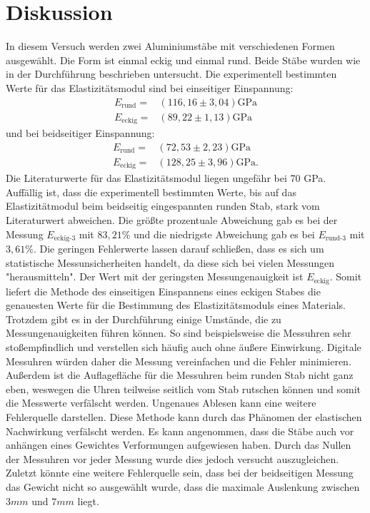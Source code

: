 \section{Diskussion}
\label{sec:Diskussion}
In diesem Versuch werden zwei Aluminiumstäbe mit verschiedenen Formen ausgewählt.
Die Form ist einmal eckig und einmal rund.
Beide Stäbe wurden wie in der Durchführung beschrieben untersucht.
Die experimentell bestimmten Werte für das Elastizitätsmodul sind bei einseitiger Einspannung:
\begin{align*}
    E_{\text{rund}}=&(116,16\pm3,04)\si{\giga\pascal}\\
    E_{\text{eckig}}=&(89,22\pm1,13)\si{\giga\pascal}
 \end{align*}
und bei beidseitiger Einspannung:
\begin{align*}
    E_{\text{rund}}=&(72,53\pm2,23)\si{\giga\pascal}\\
    E_{\text{eckig}}=&(128,25\pm3,96)\si{\giga\pascal} \text{.}
 \end{align*}
Die Literaturwerte für das Elastizitätsmodul \cite{Elastizität} liegen ungefähr bei 70 GPa. 
Auffällig ist, dass die experimentell bestimmten Werte, bis auf das Elastizitätmodul beim beidseitig eingespannten runden Stab, stark vom Literaturwert abweichen.
Die größte prozentuale Abweichung gab es bei der Messung $E_{\text{eckig-3}}$ mit $83,21\%$ und die niedrigste Abweichung gab es bei $E_{\text{rund-3}}$ mit $3,61\%$.
Die geringen Fehlerwerte lassen darauf schließen, dass es sich um statistische Messunsicherheiten handelt, da diese sich bei vielen Messungen "herausmitteln".
Der Wert mit der geringsten Messungenauigkeit ist $E_{\text{eckig}}$. 
Somit liefert die Methode des einseitigen Einspannens eines eckigen Stabes die genauesten Werte für die Bestimmung des Elastizitätsmoduls eines Materials.\\
Trotzdem gibt es in der Durchführung einige Umstände, die zu Messungenauigkeiten führen können.
So sind beispielsweise die Messuhren sehr stoßempfindlich und verstellen sich häufig auch ohne äußere Einwirkung.
Digitale Messuhren würden daher die Messung vereinfachen und die Fehler minimieren.
Außerdem ist die Auflagefläche für die Messuhren beim runden Stab nicht ganz eben, weswegen die Uhren teilweise seitlich vom Stab rutschen können und somit die Messwerte verfälscht werden.
Ungenaues Ablesen kann eine weitere Fehlerquelle darstellen.
Diese Methode kann durch das Phänomen der elastischen Nachwirkung verfälscht werden.
Es kann angenommen, dass die Stäbe auch vor anhängen eines Gewichtes Verformungen aufgewiesen haben.
Durch das Nullen der Messuhren vor jeder Messung wurde dies jedoch versucht auszugleichen.
Zuletzt könnte eine weitere Fehlerquelle sein, dass bei der beidseitigen Messung das Gewicht nicht so ausgewählt wurde, dass die maximale Auslenkung zwischen $3 \unit{mm}$ und $7 \unit{mm}$ liegt.
\pagebreak